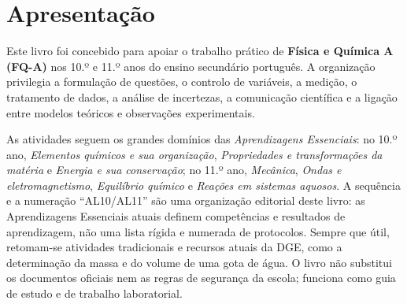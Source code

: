 \documentclass[11pt,a4paper,openany]{book}
\newcounter{desafio}
\begin{document}
\begin{titlepage}
\end{titlepage}

\frontmatter
\chapter*{Apresentação}
Este livro foi concebido para apoiar o trabalho prático de \textbf{Física e Química A (FQ-A)} nos 10.º e 11.º anos do ensino secundário português. A organização privilegia a formulação de questões, o controlo de variáveis, a medição, o tratamento de dados, a análise de incertezas, a comunicação científica e a ligação entre modelos teóricos e observações experimentais.

As atividades seguem os grandes domínios das \textit{Aprendizagens Essenciais}: no 10.º ano, \textit{Elementos químicos e sua organização}, \textit{Propriedades e transformações da matéria} e \textit{Energia e sua conservação}; no 11.º ano, \textit{Mecânica}, \textit{Ondas e eletromagnetismo}, \textit{Equilíbrio químico} e \textit{Reações em sistemas aquosos}. A sequência e a numeração ``AL10/AL11'' são uma organização editorial deste livro: as Aprendizagens Essenciais atuais definem competências e resultados de aprendizagem, não uma lista rígida e numerada de protocolos. Sempre que útil, retomam-se atividades tradicionais e recursos atuais da DGE, como a determinação da massa e do volume de uma gota de água. O livro não substitui os documentos oficiais nem as regras de segurança da escola; funciona como guia de estudo e de trabalho laboratorial.
\end{document}
